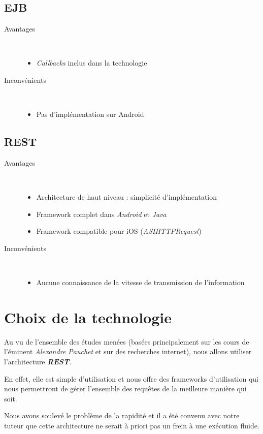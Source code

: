 \subsection{EJB}
\begin{description}
	\item[Avantages]~
	\begin{itemize}
		\item \emph{Callbacks} inclus dans la technologie
	\end{itemize}
	\item[Inconvénients]~
	\begin{itemize}
		\item Pas d'implémentation sur Android
	\end{itemize}
\end{description}

\subsection{REST}
\begin{description}
	\item[Avantages]~
	\begin{itemize}
		\item Architecture de haut niveau : simplicité d'implémentation
		\item Framework complet dans \emph{Android} et \emph{Java}
		\item Framework compatible pour iOS (\emph{ASIHTTPRequest})
	\end{itemize}
	\item[Inconvénients]~
	\begin{itemize}
		\item Aucune connaissance de la vitesse de transmission de l'information
	\end{itemize}
\end{description}

\section{Choix de la technologie}
Au vu de l'ensemble des études menées (basées principalement sur les cours de l'éminent \emph{Alexandre Pauchet} et sur des recherches internet), nous allons utiliser l'architecture \emph{\textbf{REST}}.

En effet, elle est simple d'utilisation et nous offre des frameworks d'utilisation qui nous permettront de gérer l'ensemble des requêtes de la meilleure manière qui soit.

Nous avons soulevé le problème de la rapidité et il a été convenu avec notre tuteur que cette architecture ne serait à priori pas un frein à une exécution fluide.

















